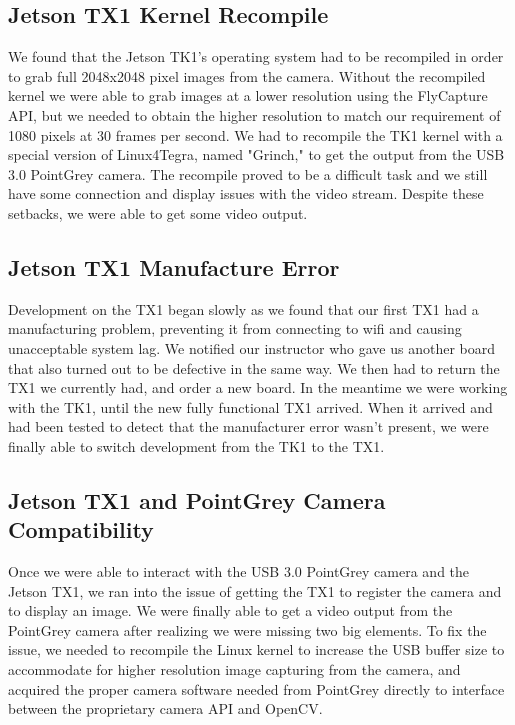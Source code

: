 \documentclass[letterpaper,10pt,titlepage]{IEEEtran}
\begin{document}
   \subsection{Jetson TX1 Kernel Recompile}
   We found that the Jetson TK1's operating system had to be recompiled in order to grab full 2048x2048 pixel images from the camera. Without the recompiled kernel we were able to grab images at a lower resolution using the FlyCapture API, but we needed to obtain the higher resolution to match our requirement of 1080 pixels at 30 frames per second. We had to recompile the TK1 kernel with a special version of Linux4Tegra, named "Grinch," to get the output from the USB 3.0 PointGrey camera. The recompile proved to be a difficult task and we still have some connection and display issues with the video stream. Despite these setbacks, we were able to get some video output.	
   
   \subsection{Jetson TX1 Manufacture Error}
   Development on the TX1 began slowly as we found that our first TX1 had a manufacturing problem, preventing it from connecting to wifi and causing unacceptable system lag. We notified our instructor who gave us another board that also turned out to be defective in the same way. We then had to return the TX1 we currently had, and order a new board. In the meantime we were working with the TK1, until the new fully functional TX1 arrived. When it arrived and had been tested to detect that the manufacturer error wasn't present, we were finally able to switch development from the TK1 to the TX1.
   
   \subsection{Jetson TX1 and PointGrey Camera Compatibility}
   Once we were able to interact with the USB 3.0 PointGrey camera and the Jetson TX1, we ran into the issue of getting the TX1 to register the camera and to display an image. We were finally able to get a video output from the PointGrey camera after realizing we were missing two big elements. To fix the issue, we needed to recompile the Linux kernel to increase the USB buffer size to accommodate for higher resolution image capturing from the camera, and acquired the proper camera software needed from PointGrey directly to interface between the proprietary camera API and OpenCV.
   
\end{document}
